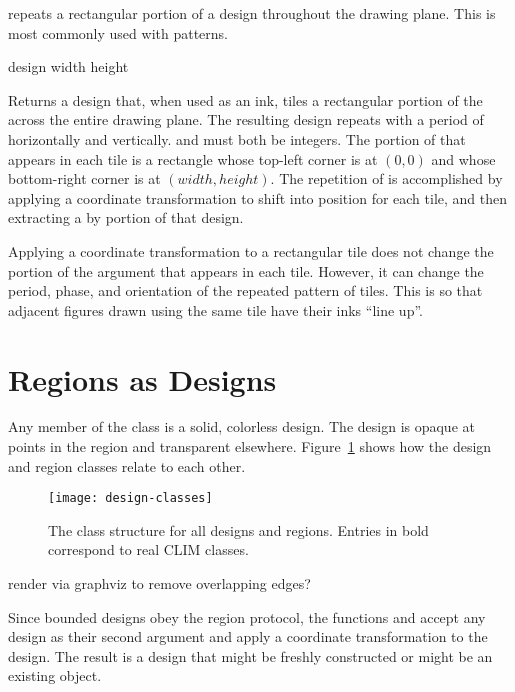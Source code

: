  repeats a rectangular portion of a design throughout the
drawing plane.  This is most commonly used with patterns.

 {design width height}

Returns a design that, when used as an ink, tiles a rectangular portion of the
  across the entire drawing plane.  The resulting
design repeats with a period of  horizontally and 
vertically.   and  must both be integers.  The portion of
 that appears in each tile is a rectangle whose top-left corner is
at $(0,0)$ and whose bottom-right corner is at $(width,height)$.  The repetition
of  is accomplished by applying a coordinate transformation to shift
 into position for each tile, and then extracting a  by
 portion of that design.

Applying a coordinate transformation to a rectangular tile does not change the
portion of the argument  that appears in each tile.  However, it can
change the period, phase, and orientation of the repeated pattern of tiles.
This is so that adjacent figures drawn using the same tile have their inks
``line up''.


\section {Regions as Designs}

Any member of the class  is a solid, colorless design.  The design is
opaque at points in the region and transparent elsewhere.
Figure~\ref{design-classes} shows how the design and region classes relate to
each other.

\begin{figure}
\centerline{\texttt{[image: design-classes]}}
\caption{\label{design-classes} The class structure for all designs and regions.
Entries in bold correspond to real CLIM classes.}
\end{figure}

 {render via graphviz to remove overlapping edges?}

Since bounded designs obey the region protocol, the functions
 and  accept any design as their
second argument and apply a coordinate transformation to the design.  The result
is a design that might be freshly constructed or might be an existing object.

